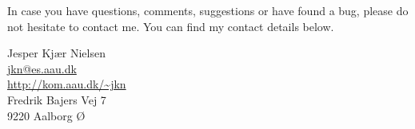 In case you have questions, comments, suggestions or have found a bug, please do not hesitate to contact me. You can find my contact details below.
  \begin{center}
    Jesper Kjær Nielsen\\
    \href{mailto: jkn@es.aau.dk}{jkn@es.aau.dk}\\
    \href{http://kom.aau.dk/~jkn}{http://kom.aau.dk/\textasciitilde jkn}\\
    Fredrik Bajers Vej 7\\
    9220 Aalborg Ø
  \end{center}
